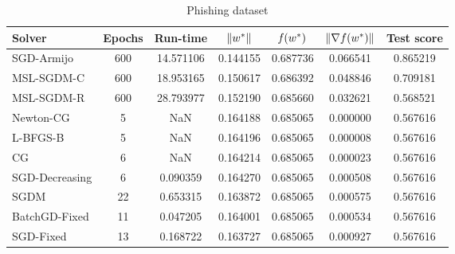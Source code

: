 \begin{table}
\caption{Phishing dataset}
\label{tab:phish-tab}
\centering
\begin{tabular}{lS[drop-zero-decimal]S[round-precision=4]S[round-precision=6]S[round-precision=6]S[exponent-mode=scientific]S[round-precision=6]}
\toprule
Solver & {Epochs} & {Run-time} & {$\lVert w^\ast\rVert$} & {$\operatorname*{\mathit{f}}(w^\ast)$} & {$\lVert\nabla f(w^\ast)\rVert$} & {Test score} \\
\midrule
SGD-Armijo & 600 & 14.571106 & 0.144155 & 0.687736 & 0.066541 & 0.865219 \\
MSL-SGDM-C & 600 & 18.953165 & 0.150617 & 0.686392 & 0.048846 & 0.709181 \\
MSL-SGDM-R & 600 & 28.793977 & 0.152190 & 0.685660 & 0.032621 & 0.568521 \\
Newton-CG & 5 & NaN & 0.164188 & 0.685065 & 0.000000 & 0.567616 \\
L-BFGS-B & 5 & NaN & 0.164196 & 0.685065 & 0.000008 & 0.567616 \\
CG & 6 & NaN & 0.164214 & 0.685065 & 0.000023 & 0.567616 \\
SGD-Decreasing & 6 & 0.090359 & 0.164270 & 0.685065 & 0.000508 & 0.567616 \\
SGDM & 22 & 0.653315 & 0.163872 & 0.685065 & 0.000575 & 0.567616 \\
BatchGD-Fixed & 11 & 0.047205 & 0.164001 & 0.685065 & 0.000534 & 0.567616 \\
SGD-Fixed & 13 & 0.168722 & 0.163727 & 0.685065 & 0.000927 & 0.567616 \\
\bottomrule
\end{tabular}
\end{table}


